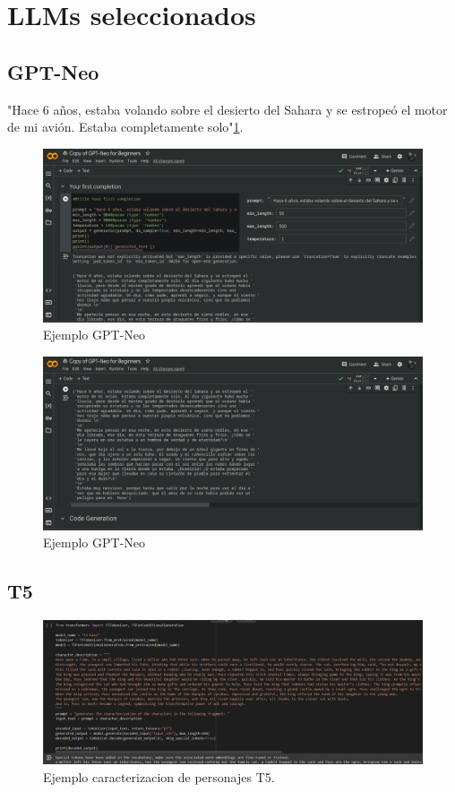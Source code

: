 \documentclass[journal,onecolumn]{IEEEtran}
\begin{document}
	\section{LLMs seleccionados}
	\subsection{GPT-Neo}
	"Hace 6 años, estaba volando sobre el desierto del Sahara y se estropeó el motor de mi avión. Estaba completamente solo"\ref{table:1}.
	\begin{figure}[H]
	\centering
	\includegraphics[scale=0.5]{gptneo_1}
	\caption{Ejemplo GPT-Neo}
	\small
	\label{table:1}
\end{figure}
	\begin{figure}[H]
	\centering
	\includegraphics[scale=0.5]{gptneo_2}
	\caption{Ejemplo GPT-Neo}
	\small
\end{figure}
	\subsection{T5}
	\begin{figure}[H]
		\centering
		\includegraphics[scale=0.5]{t5test1}
		\caption{Ejemplo caracterizacion de personajes T5.}
		\small
	\end{figure}
	
\end{document}
